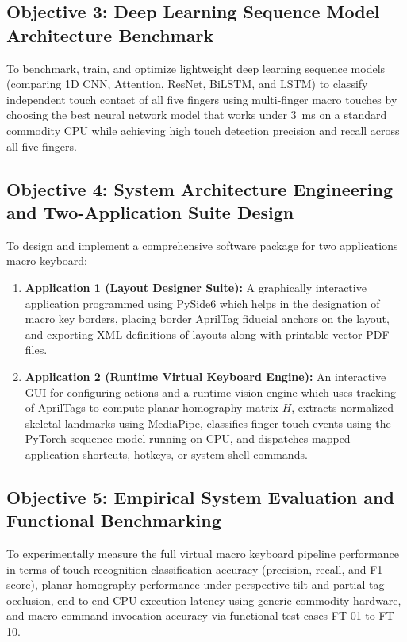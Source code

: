 \subsection{Objective 3: Deep Learning Sequence Model Architecture Benchmark}
\label{subsec:obj3_deep_learning}
To benchmark, train, and optimize lightweight deep learning sequence models (comparing 1D CNN, Attention, ResNet, BiLSTM, and LSTM) to classify independent touch contact of all five fingers using multi-finger macro touches by choosing the best neural network model that works under 3~ms on a standard commodity CPU while achieving high touch detection precision and recall across all five fingers.

\subsection{Objective 4: System Architecture Engineering and Two-Application Suite Design}
\label{subsec:obj4_suite_design}
To design and implement a comprehensive software package for two applications macro keyboard:
\begin{enumerate}
    \item \textbf{Application 1 (Layout Designer Suite):} A graphically interactive application programmed using PySide6 which helps in the designation of macro key borders, placing border AprilTag fiducial anchors on the layout, and exporting XML definitions of layouts along with printable vector PDF files.
    \item \textbf{Application 2 (Runtime Virtual Keyboard Engine):} An interactive GUI for configuring actions and a runtime vision engine which uses tracking of AprilTags to compute planar homography matrix $H$, extracts normalized skeletal landmarks using MediaPipe, classifies finger touch events using the PyTorch sequence model running on CPU, and dispatches mapped application shortcuts, hotkeys, or system shell commands.
\end{enumerate}

\subsection{Objective 5: Empirical System Evaluation and Functional Benchmarking}
\label{subsec:obj5_evaluation}
To experimentally measure the full virtual macro keyboard pipeline performance in terms of touch recognition classification accuracy (precision, recall, and F1-score), planar homography performance under perspective tilt and partial tag occlusion, end-to-end CPU execution latency using generic commodity hardware, and macro command invocation accuracy via functional test cases FT-01 to FT-10.
